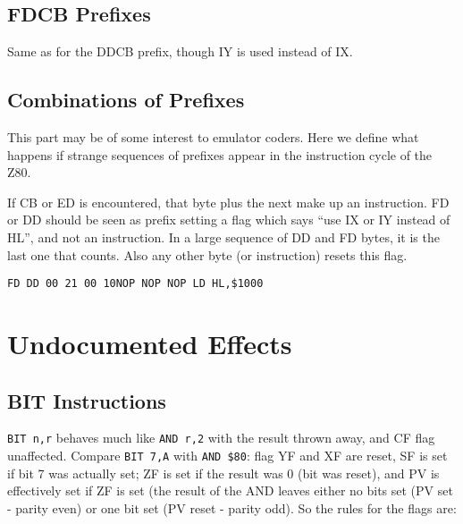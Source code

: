 \pagebreak
\subsection{FDCB Prefixes}

Same as for the DDCB prefix, though IY is used instead of IX.


\subsection{Combinations of Prefixes}

This part may be of some interest to emulator coders. Here we define what happens if strange sequences of prefixes appear in the instruction cycle of the Z80.

If CB or ED is encountered, that byte plus the next make up an instruction. FD or DD should be seen as prefix setting a flag which says ``use IX or IY instead of HL'', and not an instruction. In a large sequence of DD and FD bytes, it is the last one that counts. Also any other byte (or instruction) resets this flag.

{\tt {\qquad}FD DD 00 21 00 10{\qquad}NOP NOP NOP LD HL,\$1000}




\section{Undocumented Effects}

\subsection{BIT Instructions}
\label{bit_flags}

{\tt BIT n,r} behaves much like {\tt AND r,2{\raisebox{1ex}{n}}} with the result thrown away, and CF flag unaffected. Compare {\tt BIT 7,A} with {\tt AND \$80}: flag YF and XF are reset, SF is set if bit 7 was actually set; ZF is set if the result was 0 (bit was reset), and PV is effectively set if ZF is set (the result of the AND leaves either no bits set (PV set - parity even) or one bit set (PV reset - parity odd). So the rules for the flags are:

